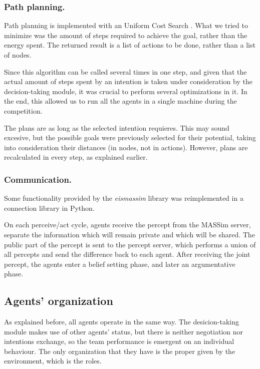 \documentclass{llncs2e/llncs}
\begin{document}
\subsubsection{Path planning.}

    Path planning is implemented with an Uniform Cost Search 
    \cite{Russell:2003:AIM:773294}. 
    What we tried to minimize was the amount of steps required to achieve the 
    goal, rather than the energy spent. 
    The returned result is a list of actions to be done, rather than a list of 
    nodes.
    
    Since this algorithm can be called several times in one step, and given that the 
    actual amount of steps spent by an intention is taken under consideration by 
    the decision-taking module, it was crucial to perform several optimizations in 
    it. In the end, this allowed us to run all the agents in a single machine  
    during the competition.
    
    The plans are as long as the selected intention requieres. This may 
    sound excesive, but the possible goals were previously selected for their 
    potential, taking into consideration their distances (in nodes, not in 
    actions). However, plans are recalculated in every step, as explained earlier.    

\subsubsection{Communication.}

    Some functionality provided by the \textit{eismassim} library was
    reimplemented in a connection library in Python.

    On each perceive/act cycle, agents receive the percept from the MASSim server, 
    separate the information which will remain private and which will be shared. 
    The public part of the percept is sent to the percept server, which performs a 
    union of all percepts and send the difference back to each agent. After 
    receiving the joint percept, the agents enter a belief setting phase, and 
    later an argumentative phase.

\subsection{Agents' organization}

    As explained before, all agents operate in the same way. The desicion-taking
    module makes use of other agents' status, but there is neither negotiation nor 
    intentions exchange, so the team performance is emergent on an individual behaviour. 
    The only organization that they have is the proper given by the environment, 
    which is the roles.
    
\end{document}
